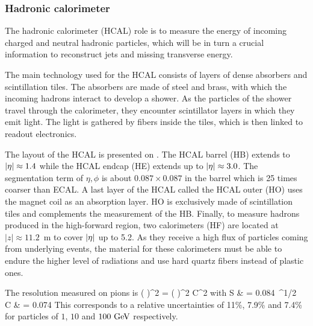         \subsubsection{Hadronic calorimeter}

    The hadronic calorimeter (HCAL) role is to measure the energy of incoming charged
    and neutral hadronic particles, which will be in turn a crucial information to
    reconstruct jets and missing transverse energy.

    The main technology used for the HCAL consists of layers of dense absorbers and
    scintillation tiles. The absorbers are made of steel and brass, with which
    the incoming hadrons interact to develop a shower. As the particles of the shower
    travel through the calorimeter, they encounter scintillator layers in which they
    emit light. The light is gathered by fibers inside the tiles, which is then
    linked to readout electronics.


    The layout of the HCAL is presented on . The HCAL barrel
    (HB) extends to $\left| \eta \right| \approx 1.4$ while the HCAL endcap (HE) extends up to
    $\left| \eta \right| \approx 3.0$. The segmentation term of $\eta,\phi$ is about $0.087 \times 0.087$
    in the barrel which is 25 times coarser than ECAL. A last layer of the HCAL called
    the HCAL outer (HO) uses the magnet coil as an absorption layer. HO is exclusively
    made of scintillation tiles and complements the measurement of the HB. Finally, to
    measure hadrons produced in the high-forward region, two calorimeters (HF) are located at
    $\left|z\right| \approx 11.2$~m to cover $\left| \eta \right|$ up to 5.2. As they receive a high flux of
    particles coming from underlying events, the material for these calorimeters must
    be able to endure the higher level of radiations and use hard quartz fibers instead of
    plastic ones.

    The resolution measured on pions is
    {
        \left(  \right)^2
        =
        \left(  \right)^2
        \oplus
        C^2
    }
    with
    {
        S & = 0.084~^{1/2} \\
        C & = 0.074\nonumber
    }
    This corresponds to a relative uncertainties of 11\%, 7.9\% and 7.4\% for particles
    of $1$, $10$ and $100~\text{GeV}$ respectively.

